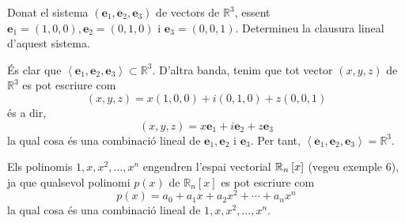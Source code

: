 \begin{exemple}
Donat el sistema $(\mathbf{e}_{1},\mathbf{e}_{2},\mathbf{e}_{3})$ de vectors
de $\mathbb{R}^{3}$, essent $\mathbf{e}_{1}=(1,0,0),\mathbf{e}_{2}=(0,1,0)$
i $\mathbf{e}_{3}=(0,0,1)$. Determineu la clausura lineal d’aquest sistema.

\end{exemple}
\begin{solucio}
És clar que $\left\langle \mathbf{e}_{1},\mathbf{e}_{2},\mathbf{e}%
_{3}\right\rangle \subset \mathbb{R}^{3}$. D’altra banda, tenim que tot
vector $(x,y,z)$ de $\mathbb{R}^{3}$ es pot escriure com%
\begin{equation*}
(x,y,z)=x(1,0,0)+i(0,1,0)+z(0,0,1)
\end{equation*}%
és a dir,%
\begin{equation*}
(x,y,z)=x\mathbf{e}_{1}+i\mathbf{e}_{2}+z\mathbf{e}_{3}
\end{equation*}%
la qual cosa és una combinació lineal de $\mathbf{e}_{1},\mathbf{e}_{2}$ i $%
\mathbf{e}_{3}$. Per tant, $\left\langle \mathbf{e}_{1},\mathbf{e}_{2},%
\mathbf{e}_{3}\right\rangle =\mathbb{R}^{3}$.
\end{solucio}

\begin{exemple}
Els polinomis $1,x,x^{2},...,x^{n}$ engendren l'espai vectorial $\mathbb{%
R}_{n}\left[ x\right] $ (vegeu exemple 6), ja que qualsevol polinomi $%
p(x) $ de $\mathbb{R}_{n}\left[ x\right] $ es pot escriure com%
\begin{equation*}
p(x)=a_{0}+a_{1}x+a_{2}x^{2}+\cdots +a_{n}x^{n}
\end{equation*}%
la qual cosa és una combinació lineal de $1,x,x^{2},...,x^{n}$.
\end{exemple}

